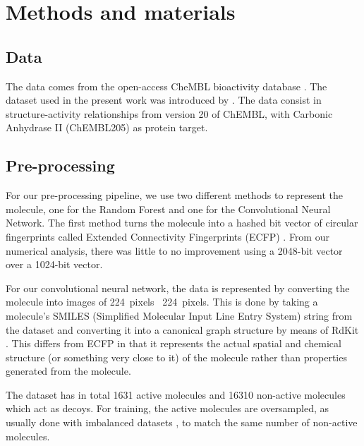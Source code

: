 \documentclass[\ifafour a4paper,12pt,\else a5paper,10pt,\fi%
onecolumn,oneside,article,%
british%
]{memoir}
\theoremstyle{remark}
\theoremstyle{innote}
\renewcommand*{\|}[1][]{\nonscript\:#1\vert\nonscript\:\mathopen{}}
\begin{document}
\section{Methods and materials}
 
\subsection{Data} 
  
The data comes from the open-access CheMBL bioactivity database \autocites{bentoetal2014}. The dataset used in the present work was introduced by \textcite{koutsoukasetal2017}. The data consist in structure-activity relationships from version 20 of ChEMBL, with Carbonic Anhydrase II (ChEMBL205) as protein target.


\subsection{Pre-processing} 

For our pre-processing pipeline, we use two different methods to represent the molecule, one for the Random Forest and one for the Convolutional Neural Network. The first method turns the molecule into a hashed bit vector of circular fingerprints called Extended Connectivity Fingerprints (ECFP) \autocites{rogersetal2010}. From our numerical analysis, there was little to no improvement using a 2048-bit vector over a 1024-bit vector. 
  
For our convolutional neural network, the data is represented by converting the molecule into images of 224~pixels \texttimes\ 224~pixels. This is done by taking a molecule's SMILES (Simplified Molecular Input Line Entry System) string \autocites{davidetal2020} from the dataset and converting it into a canonical graph structure by means of RdKit \autocites{rdkit2017}. This differs from ECFP in that it represents the actual spatial and chemical structure (or something very close to it) of the molecule rather than properties generated from the molecule.

The dataset has in total 1631 active molecules and 16310 non-active molecules which act as decoys. For training, the active molecules are oversampled, as usually done with imbalanced datasets \autocites{provost2000}, to match the same number of non-active molecules.
\end{document}
